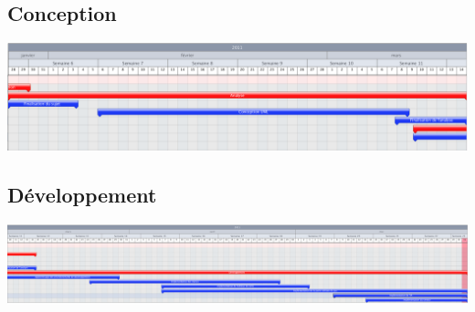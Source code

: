 	\subsection*{Conception}
		\begin{center}
			\includegraphics[width=20cm, angle=90]{./Organisation/Img/BomberBlok-Conception.eps}
		\end{center}
	
	\subsection*{Développement}
		\begin{center}
			\includegraphics[width=20cm, angle=90]{./Organisation/Img/BomberBlok-Developpement.eps}
		\end{center}
